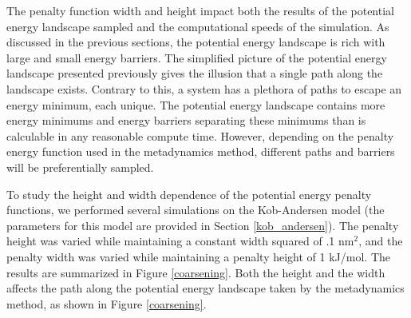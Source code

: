 The penalty function width and height impact both the results of the potential energy landscape sampled and the computational speeds of the simulation.  As discussed in the previous sections, the potential energy landscape is rich with large and small energy barriers.  The simplified picture of the potential energy landscape presented previously gives the illusion that a single path along the landscape exists.  Contrary to this, a system has a plethora of paths to escape an energy minimum, each unique.  The potential energy landscape contains more energy minimums and energy barriers separating these minimums than is calculable in any reasonable compute time.  However, depending on the penalty energy function used in the metadynamics method, different paths and barriers will be preferentially sampled.  

To study the height and width dependence of the potential energy penalty functions, we performed several simulations on the Kob-Andersen model (the parameters for this model are provided in Section \ref{kob_andersen}).  The penalty height was varied while maintaining a constant width squared of .1 nm$^2$, and the penalty width was varied while maintaining a penalty height of 1 kJ/mol.  The results are summarized in Figure \ref{coarsening}.  Both the height and the width affects the path along the potential energy landscape taken by the metadynamics method, as shown in Figure \ref{coarsening}.  

